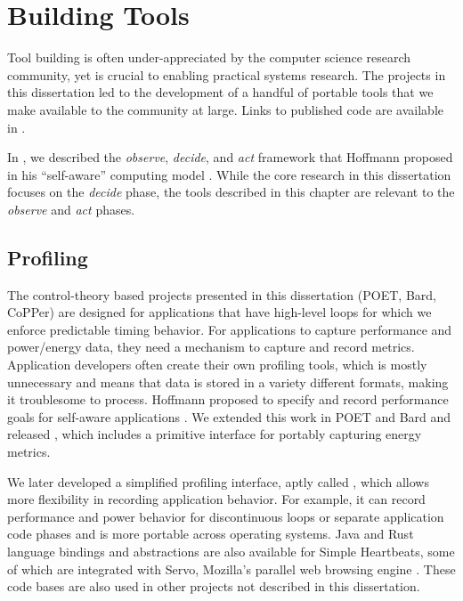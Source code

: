 \chapter{Building Tools}
\label{app:tools}

Tool building is often under-appreciated by the computer science research community, yet is crucial to enabling practical systems research.
The projects in this dissertation led to the development of a handful of portable tools that we make available to the community at large.
Links to published code are available in .

In , we described the \emph{observe}, \emph{decide}, and \emph{act} framework that Hoffmann proposed in his ``self-aware'' computing model \cite{HoffmannPhD}.
While the core research in this dissertation focuses on the \emph{decide} phase, the tools described in this chapter are relevant to the \emph{observe} and \emph{act} phases.


\section{Profiling}
\label{app:profiling}

The control-theory based projects presented in this dissertation (POET, Bard, CoPPer) are designed for applications that have high-level loops for which we enforce predictable timing behavior.
For applications to capture performance and power/energy data, they need a mechanism to capture and record metrics.
Application developers often create their own profiling tools, which is mostly unnecessary and means that data is stored in a variety different formats, making it troublesome to process.
Hoffmann \etal proposed  to specify and record performance goals for self-aware applications \cite{icac2010heartbeats}.
We extended this work in POET and Bard and released , which includes a primitive interface for portably capturing energy metrics.

We later developed a simplified profiling interface, aptly called , which allows more flexibility in recording application behavior.
For example, it can record performance and power behavior for discontinuous loops or separate application code phases and is more portable across operating systems.
Java and Rust language bindings and abstractions are also available for Simple Heartbeats, some of which are integrated with Servo, Mozilla's parallel web browsing engine \cite{servo}.
These code bases are also used in other projects not described in this dissertation.

